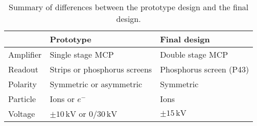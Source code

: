 \begin{table}[!h]
  \centering
  \caption[Summary of differences between the prototype design and the final design]{Summary of differences between the prototype design and the final design.}
  \label{chap5:tab:recap}
  \begin{tabularx}{\linewidth}{lXX}
    \toprule
              & Prototype                                    & Final design            \\
    \midrule
    Amplifier & Single stage MCP                             & Double stage MCP        \\
    Readout   & Strips or phosphorus screens                 & Phosphorus screen (P43) \\
    Polarity  & Symmetric or asymmetric                      & Symmetric               \\
    Particle  & Ions or $e^{-}$                              & Ions                    \\
    Voltage   & $\pm 10\,\mathrm{kV}$ or $0/30\,\mathrm{kV}$ & $\pm 15\,\mathrm{kV}$   \\
    \bottomrule
  \end{tabularx}
\end{table}
